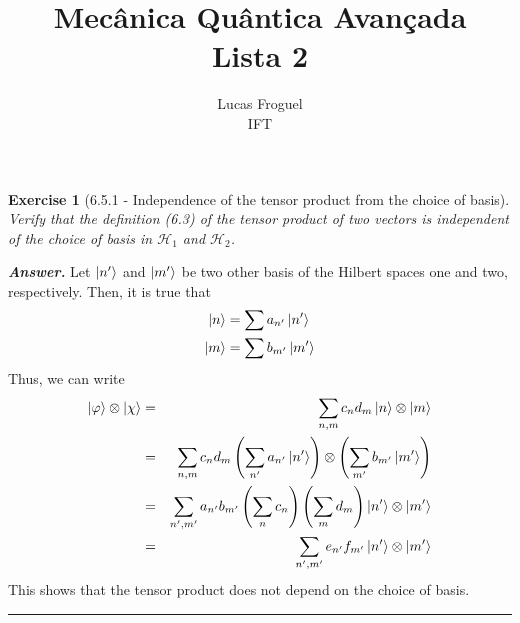 \documentclass[12pt]{article}
\title{Mecânica Quântica Avançada \\ Lista 2}
\author{Lucas Froguel \\ IFT}
\date{}
\def\be{\begin{equation}}
\def\ee{\end{equation}}
\def\bea{\begin{eqnarray*}}
\def\eea{\end{eqnarray*}}
\def\l{\left}
\def\r{\right}
\newtheorem{exercise}{Exercise}
\newenvironment{answer}{\noindent\textbf{\textit{Answer.}} \normalfont }{\par\noindent\rule{\textwidth}{0.4pt}}
\begin{document}
	\maketitle
	\listoftheorems[title={List of Exercises}]
	
	\begin{exercise}[6.5.1 - Independence of the tensor product from the choice of basis]
		Verify that the definition (6.3) of the tensor product of two vectors is independent of the choice of basis in $\mathcal{H}_1$ and $\mathcal{H}_2$.
	\end{exercise}
	\begin{answer}
		Let $\ket{n'}$ and $\ket{m'}$ be two other basis of the Hilbert spaces one and two, respectively. Then, it is true that
		\be
			\begin{aligned}
				\ket{n} &= \sum a_{n'}\ket{n'} \\
				\ket{m} &= \sum b_{m'}\ket{m'}
			\end{aligned}	
		\ee	
		Thus, we can write
		\bea
			\ket{\varphi}\otimes\ket{\chi} &=& \sum_{n, m} c_nd_m\ket{n}\otimes\ket{m} \\ 
				&=& \sum_{n, m} c_nd_m \l(\sum_{n'} a_{n'}\ket{n'}\r) \otimes \l(\sum_{m'}b_{m'}\ket{m'} \r) \\
				&=& \sum_{n', m'} a_{n'}b_{m'} \l(\sum_n c_n \r) \l(\sum_m d_m\r) \ket{n'}\otimes\ket{m'} \\
				&=& \sum_{n', m'} e_{n'} f_{m'} \ket{n'}\otimes\ket{m'}
		\eea
		This shows that the tensor product does not depend on the choice of basis.		
	\end{answer}
\end{document}
